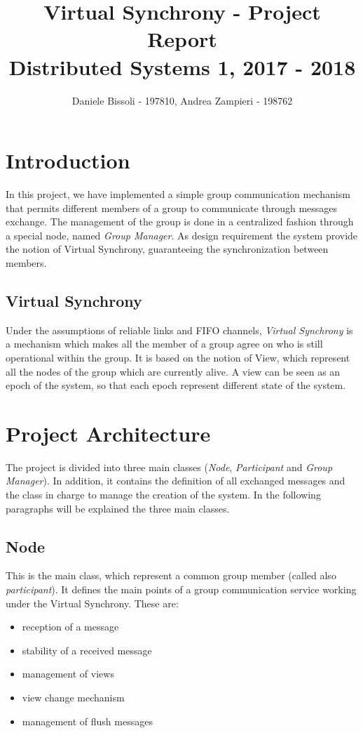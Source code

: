 \documentclass[11pt]{article}
\title{\LARGE{\textbf{Virtual Synchrony - Project Report}\\[0mm]\large{Distributed Systems 1, 2017 - 2018}}}
\author{Daniele Bissoli - 197810, Andrea Zampieri - 198762}
\date{}
\begin{document}
	\maketitle
	
	\section{Introduction}
	In this project, we have implemented a simple group communication mechanism that permits different members of a group to communicate through messages exchange. The management of the group is done in a centralized fashion through a special node, named \textit{Group Manager}. As design requirement the system provide the notion of Virtual Synchrony, guaranteeing the synchronization between members.
	
	\subsection{Virtual Synchrony}
	Under the assumptions of reliable links and FIFO channels, \textit{Virtual Synchrony} is a mechanism which makes all the member of a group agree on who is still operational within the group. It is based on the notion of View, which represent all the nodes of the group which are currently alive. A view can be seen as an epoch of the system, so that each epoch represent different state of the system.
	
	\section{Project Architecture}
	The project is divided into three main classes (\textit{Node}, \textit{Participant} and \textit{Group Manager}). In addition, it contains the definition of all exchanged messages and the class in charge to manage the creation of the system. In the following paragraphs will be explained the three main classes.
	
	\subsection{Node}
	This is the main class, which represent a common group member (called also \textit{participant}). It defines the main points of a group communication service working under the Virtual Synchrony. These are:
	\begin{itemize}
		\item reception of a message
		\item stability of a received message
		\item management of views
		\item view change mechanism
		\item management of flush messages
	\end{itemize}
	
\end{document}
